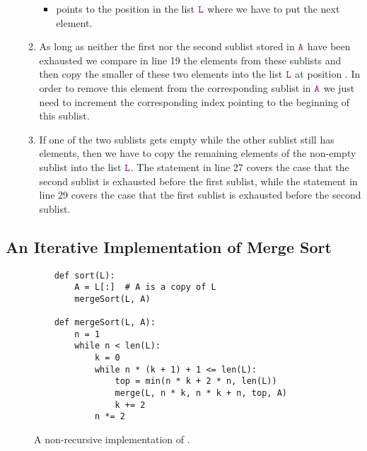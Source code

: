 \begin{enumerate}
\begin{enumerate}
\begin{itemize}
            \item {} points to the position in the list $\mytt{L}$ where we have to put the next
                  element.
            \end{itemize}
      \item As long as neither the first nor the second sublist stored in $\mytt{A}$ have been exhausted
            we compare in line 19 the elements from these sublists and then copy the smaller of these
            two elements into the list $\mytt{L}$ at position .
            In order to remove this element from the corresponding sublist in $\mytt{A}$ we just need to
            increment the corresponding index pointing to the beginning of this sublist.
      \item If one of the two sublists gets empty while the other sublist still has elements, then we have
            to copy the remaining elements of the non-empty sublist into the list $\mytt{L}$.
            The statement in line 27 covers the case that the second sublist is exhausted before 
            the first sublist, while the statement in line 29 covers the case that the first
            sublist is exhausted before the second sublist.
      \end{enumerate}
\end{enumerate}

\subsection{An Iterative Implementation of Merge Sort}

\begin{figure}[!ht]
  \centering
\begin{verbatim}
    def sort(L):
        A = L[:]  # A is a copy of L
        mergeSort(L, A)

    def mergeSort(L, A):
        n = 1
        while n < len(L):
            k = 0
            while n * (k + 1) + 1 <= len(L):
                top = min(n * k + 2 * n, len(L))
                merge(L, n * k, n * k + n, top, A)
                k += 2    
            n *= 2 
\end{verbatim}
\vspace*{-0.3cm}
  \caption{A non-recursive implementation of .}
  \label{fig:merge-sort-nr.stlx}
\end{figure}

